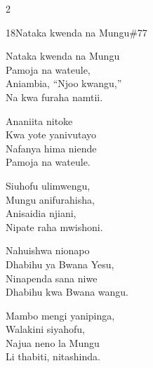 \documentclass{article}
\begin{document}
\begin{multicols}{2}
\begin{hymn}{18}{Nataka kwenda na Mungu}{\#77}
\begin{stanza}
Nataka kwenda na Mungu\\
Pamoja na wateule,\\
Aniambia, ``Njoo kwangu,''\\
Na kwa furaha namtii.
\end{stanza}
\begin{chorus}
Ananiita nitoke\\
Kwa yote yanivutayo\\
Nafanya hima niende\\
Pamoja na wateule.
\end{chorus}
\begin{stanza}
Siuhofu ulimwengu,\\
Mungu anifurahisha,\\
Anisaidia njiani,\\
Nipate raha mwishoni.
\end{stanza}
\begin{stanza}
Nahuishwa nionapo\\
Dhabihu ya Bwana Yesu,\\
Ninapenda sana niwe\\
Dhabihu kwa Bwana wangu.
\end{stanza}
\begin{stanza}
Mambo mengi yanipinga,\\
Walakini siyahofu,\\
Najua neno la Mungu\\
Li thabiti, nitashinda.
\end{stanza}
\end{hymn}


\end{multicols}
\end{document}

